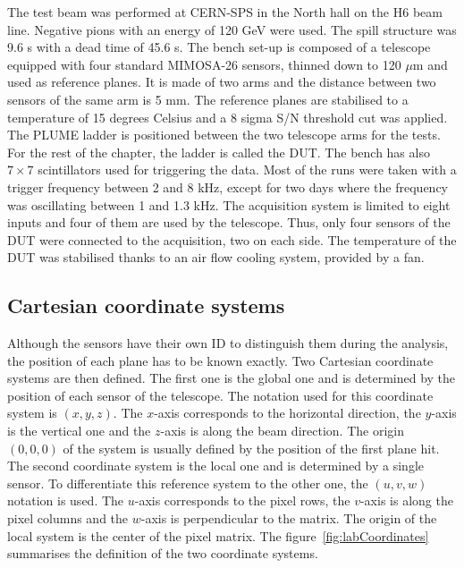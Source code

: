     The test beam was performed at CERN-SPS in the North hall on the H6 beam line.
    Negative pions with an energy of 120 GeV were used.
    The spill structure was 9.6 s with a dead time of 45.6 s. 
    The bench set-up is composed of a telescope equipped with four standard MIMOSA-26 sensors, thinned down to 120 $\mu\text{m}$ and used as reference planes.
    It is made of two arms and the distance between two sensors of the same arm is 5 mm.
    The reference planes are stabilised to a temperature of 15 degrees Celsius and a 8 sigma S/N threshold cut was applied.
    The \gls{PLUME} ladder is positioned between the two telescope arms for the tests.
    For the rest of the chapter, the ladder is called the \gls{DUT}.
    The bench has also $7 \times 7$ scintillators used for triggering the data.
    Most of the runs were taken with a trigger frequency between 2 and 8 kHz, except for two days where the frequency was oscillating between 1 and 1.3 kHz.
    The acquisition system is limited to eight inputs and four of them are used by the telescope.
    Thus, only four sensors of the \gls{DUT} were connected to the acquisition, two on each side.
    The temperature of the \gls{DUT} was stabilised thanks to an air flow cooling system, provided by a fan.

    \subsection{Cartesian coordinate systems}

    Although the sensors have their own ID to distinguish them during the analysis, the position of each plane has to be known exactly.
    Two Cartesian coordinate systems are then defined.
    The first one is the global one and is determined by the position of each sensor of the telescope.
    The notation used for this coordinate system is $(x,y,z)$.
    The $x$-axis corresponds to the horizontal direction, the $y$-axis is the vertical one and the $z$-axis is along the beam direction.
    The origin $(0,0,0)$ of the system is usually defined by the position of the first plane hit.
    The second coordinate system is the local one and is determined by a single sensor.
    To differentiate this reference system to the other one, the $(u,v,w)$  notation is used.
    The $u$-axis corresponds to the pixel rows, the $v$-axis is along the pixel columns and the $w$-axis is perpendicular to the matrix.
    The origin of the local system is the center of the pixel matrix.
    The figure~\ref{fig:labCoordinates} summarises the definition of the two coordinate systems.

